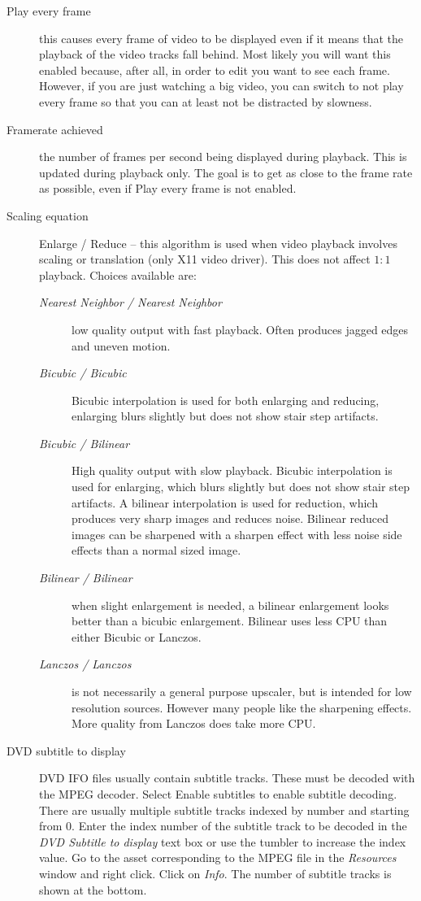 \begin{description}
    \item[Play every frame] this causes every frame of video to be displayed even if it means that the playback of the video tracks fall behind. Most likely you will want this enabled because, after all, in order to edit you want to see each frame.  However, if you are just watching a big video, you can switch to not play every frame so that you can at least not be distracted by slowness.
    \item[Framerate achieved] the number of frames per second being displayed during playback. This is updated during playback only.  The goal is to get as close to the frame rate as possible, even if Play every frame is not enabled.
    \item[Scaling equation] Enlarge / Reduce -- this algorithm is used when video playback involves scaling or translation (only X11 video driver). This does not affect $1:1$ playback.  Choices available are:
    \begin{description}
        \item[\textit{Nearest Neighbor / Nearest Neighbor}] low quality output with fast playback. Often produces jagged edges and uneven motion.
        \item[\textit{Bicubic / Bicubic}] Bicubic interpolation is used for both enlarging and reducing, enlarging blurs slightly but does not show stair step artifacts.
        \item[\textit{Bicubic / Bilinear}] High quality output with slow playback. Bicubic interpolation is used for enlarging, which blurs slightly but does not show stair step artifacts. A bilinear interpolation is used for reduction, which produces very sharp images and reduces noise. Bilinear reduced images can be sharpened with a sharpen effect with less noise side effects than a normal sized image.
        \item[\textit{Bilinear / Bilinear}] when slight enlargement is needed, a bilinear enlargement looks better than a bicubic enlargement.  Bilinear uses less CPU than either Bicubic or Lanczos.
        \item[\textit{Lanczos / Lanczos}] is not necessarily a general purpose upscaler, but is intended for low resolution sources. However many people like the sharpening effects.  More quality from Lanczos does take more CPU.
    \end{description}
    \item[DVD subtitle to display] DVD IFO files usually contain subtitle tracks. These must be decoded with the MPEG decoder. Select Enable subtitles to enable subtitle decoding. There are usually multiple  subtitle tracks indexed by number and starting from 0. Enter the index number of the subtitle track to be decoded in the \textit{DVD Subtitle to display} text box or use the tumbler to increase the index value. Go to the asset corresponding to the MPEG file in the \textit{Resources} window and right click. Click on \textit{Info}. The number of subtitle tracks is shown at the bottom.

\end{description}
